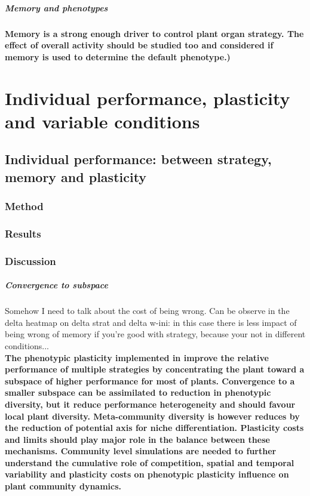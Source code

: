 \paragraph{Memory and phenotypes}

\textbf{Memory is a strong enough driver to control plant organ strategy. The effect of overall activity should be studied too and considered if memory is used to determine the default phenotype.)}

\chapter{Individual performance, plasticity and variable conditions}
\section{Individual performance: between strategy, memory and plasticity}

\subsection{Method}

\subsection{Results}


\subsection{Discussion}

\paragraph{Convergence to subspace}

Somehow I need to talk about the cost of being wrong. Can be observe in the delta heatmap on delta strat and delta w-ini: in this case there is less impact of being wrong of memory if you're good with strategy, because your not in different conditions...\\

\textbf{The phenotypic plasticity implemented in \model improve the relative performance of multiple strategies by concentrating the plant toward a subspace of higher performance for most of plants. Convergence to a smaller subspace can be assimilated to reduction in phenotypic diversity, but it reduce performance heterogeneity and should favour local plant diversity. Meta-community diversity is however reduces by the reduction of potential axis for niche differentiation. Plasticity costs and limits should play major role in the balance between these mechanisms. Community level simulations are needed to further understand the cumulative role of competition, spatial and temporal variability and plasticity costs on phenotypic plasticity influence on plant community dynamics.}


